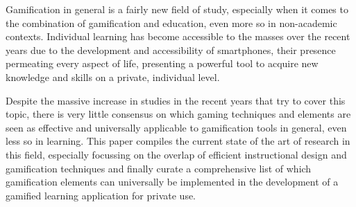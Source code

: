 Gamification in general is a fairly new field of study, especially when it comes to the combination of gamification and education, even more so in non-academic contexts. Individual learning has become accessible to the masses over the recent years due to the development and accessibility of smartphones, their presence permeating every aspect of life, presenting a powerful tool to acquire new knowledge and skills on a private, individual level.

Despite the massive increase in studies in the recent years that try to cover this topic, there is very little consensus on which gaming techniques and elements are seen as effective and universally applicable to gamification tools in general, even less so in learning. This paper compiles the current state of the art of research in this field, especially focussing on the overlap of efficient instructional design and gamification techniques and finally curate a comprehensive list of which gamification elements can universally be implemented in the development of a gamified learning application for private use.